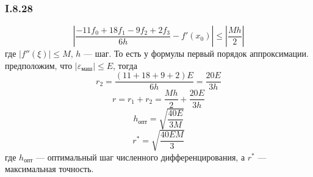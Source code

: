 \subsubsection*{I.8.28}
$$\left|\frac{-11f_0+18f_1-9f_2+2f_3}{6h} - f'(x_0)\right| \leq \left|\frac{Mh}{2}\right|$$
где $|f''(\xi)|\leq M$, $h$ --- шаг. То есть у формулы первый порядок аппроксимации.
предположим, что $|\varepsilon_{маш}| \leq E$, тогда 
$$r_2 = \frac{(11+18+9+2)E}{6h} = \frac{20E}{3h}$$
$$r = r_1 + r_2 = \frac{Mh}{2} + \frac{20E}{3h}$$
$$h_{опт}  = \sqrt{\frac{40E}{3M}}$$
$$r^* = \sqrt{\frac{40EM}{3}}$$
где $h_{опт}$ --- оптимальный шаг численного дифференцирования, а $r^*$ --- максимальная точность.
